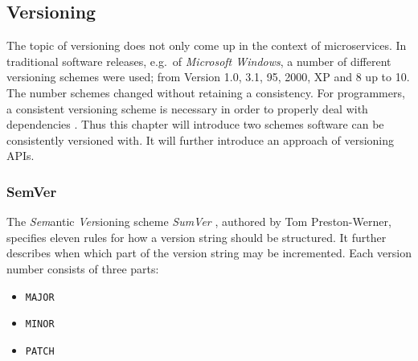 
\subsection{Versioning}%
\label{sub:Versioning}
The topic of versioning does not only come up in the context of microservices.
In traditional software releases, e.g.\ of \textit{Microsoft Windows}, a number
of different versioning schemes were used; from Version 1.0, 3.1, 95, 2000, XP
and 8 up to 10. The number schemes changed without retaining a consistency. For
programmers, a consistent versioning scheme is necessary in order to properly
deal with dependencies \autocite{Preston-WernerSemanticVersioning2.0.0}. Thus
this chapter will introduce two schemes software can be consistently versioned
with. It will further introduce an approach of versioning \acp{API}.

\subsubsection{SemVer}%
\label{ssub:SemVer}
The \textit{Sem}antic \textit{Ver}sioning scheme \textit{SumVer}
\autocite{Preston-WernerSemanticVersioning2.0.0}, authored by Tom
Preston-Werner, specifies eleven rules for how a version string should be
structured. It further describes when which part of the version string may be
incremented. Each version number consists of three parts:

\begin{itemize}
  \item \texttt{MAJOR}
  \item \texttt{MINOR}
  \item \texttt{PATCH}
\end{itemize}

